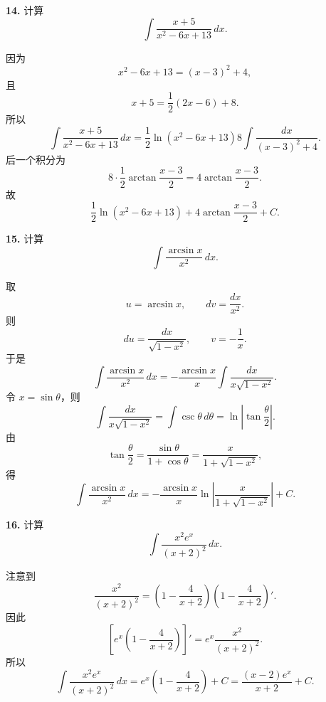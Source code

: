 \begin{problemblock}
\textbf{14.} 计算
\[
\int\frac{x+5}{x^2-6x+13}\,dx.
\]
\end{problemblock}

\begin{solutionblock}
因为
\[
x^2-6x+13=(x-3)^2+4,
\]
且
\[
x+5=\frac12(2x-6)+8.
\]
所以
\[
\int\frac{x+5}{x^2-6x+13}\,dx
=\frac12\ln(x^2-6x+13)
8\int\frac{dx}{(x-3)^2+4}.
\]
后一个积分为
\[
8\cdot\frac12\arctan\frac{x-3}{2}
=4\arctan\frac{x-3}{2}.
\]
故
\[
\boxed{\frac12\ln(x^2-6x+13)+4\arctan\frac{x-3}{2}+C}.
\]
\end{solutionblock}

\begin{problemblock}
\textbf{15.} 计算
\[
\int\frac{\arcsin x}{x^2}\,dx.
\]
\end{problemblock}

\begin{solutionblock}
取
\[
u=\arcsin x,\qquad dv=\frac{dx}{x^2}.
\]
则
\[
du=\frac{dx}{\sqrt{1-x^2}},\qquad v=-\frac1x.
\]
于是
\[
\int\frac{\arcsin x}{x^2}\,dx
=-\frac{\arcsin x}{x}
\int\frac{dx}{x\sqrt{1-x^2}}.
\]
令 \(x=\sin\theta\)，则
\[
\int\frac{dx}{x\sqrt{1-x^2}}
=\int \csc\theta\,d\theta
=\ln\left|\tan\frac{\theta}{2}\right|.
\]
由
\[
\tan\frac{\theta}{2}=\frac{\sin\theta}{1+\cos\theta}
=\frac{x}{1+\sqrt{1-x^2}},
\]
得
\[
\boxed{
\int\frac{\arcsin x}{x^2}\,dx
=-\frac{\arcsin x}{x}
\ln\left|\frac{x}{1+\sqrt{1-x^2}}\right|+C }.
\]
\end{solutionblock}

\begin{problemblock}
\textbf{16.} 计算
\[
\int\frac{x^2e^x}{(x+2)^2}\,dx.
\]
\end{problemblock}

\begin{solutionblock}
注意到
\[
\frac{x^2}{(x+2)^2}
=\left(1-\frac4{x+2}\right)
\left(1-\frac4{x+2}\right)'.
\]
因此
\[
\left[e^x\left(1-\frac4{x+2}\right)\right]'
=e^x\frac{x^2}{(x+2)^2}.
\]
所以
\[
\boxed{
\int\frac{x^2e^x}{(x+2)^2}\,dx
=e^x\left(1-\frac4{x+2}\right)+C
=\frac{(x-2)e^x}{x+2}+C }.
\]
\end{solutionblock}


